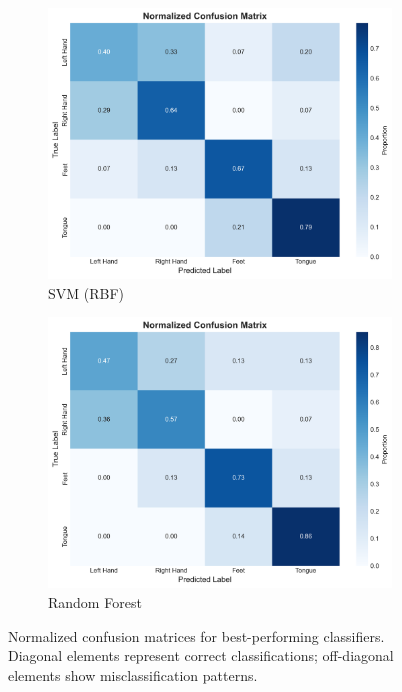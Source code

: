 \documentclass[11pt]{article}
\begin{document}
\begin{figure}[H]
    \centering
    \begin{subfigure}[b]{0.45\textwidth}
        \includegraphics[width=\textwidth]{../results/figures/04_svm_confusion_matrix.png}
        \caption{SVM (RBF)}
    \end{subfigure}
    \hfill
    \begin{subfigure}[b]{0.45\textwidth}
        \includegraphics[width=\textwidth]{../results/figures/04_rf_confusion_matrix.png}
        \caption{Random Forest}
    \end{subfigure}
    \caption{Normalized confusion matrices for best-performing classifiers. Diagonal elements represent correct classifications; off-diagonal elements show misclassification patterns.}
    \label{fig:confusion_matrices}
\end{figure}
\end{document}
